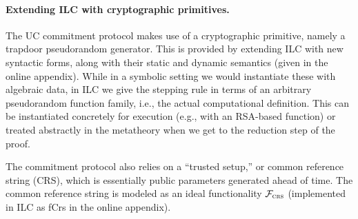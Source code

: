 
\paragraph{Extending ILC with cryptographic primitives.}
The UC commitment protocol makes use of a cryptographic primitive, namely a
trapdoor pseudorandom generator. This is provided by extending ILC with new
syntactic forms, along with their static and dynamic semantics (given in
the online appendix).
While in a symbolic setting we would instantiate these with algebraic data, in ILC we give the stepping rule in terms of an arbitrary pseudorandom function family, i.e., the actual computational definition.
This can be instantiated concretely for execution (e.g., with an RSA-based function) or treated abstractly in the metatheory when we get to the reduction step of the proof.

The commitment protocol also relies on a
``trusted setup,'' or common reference string (CRS), which is essentially
public parameters generated ahead of time. The common reference string is
modeled as an ideal functionality $\mathcal{{F}}_{\textsc{crs}}$ (implemented
in ILC as \textsf{fCrs} in the online appendix).




